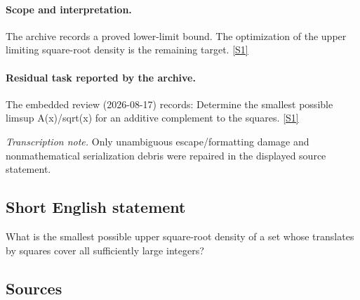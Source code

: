 \documentclass[11pt,a4paper]{article}
\newcommand{\sref}[2]{\hyperlink{source:#1:#2}{[S#2]}}
\begin{document}
\paragraph{Scope and interpretation.}

The archive records a proved lower-limit bound. The optimization of the upper limiting square-root density is the remaining target. \sref{1893}{1}

\paragraph{Residual task reported by the archive.}

The embedded review (2026-08-17) records: Determine the smallest possible limsup A(x)/sqrt(x) for an additive complement to the squares. \sref{1893}{1}

{\small\emph{Transcription note.} Only unambiguous escape/formatting damage and nonmathematical serialization debris were repaired in the displayed source statement.}

\subsection{Short English statement}

What is the smallest possible upper square-root density of a set whose translates by squares cover all sufficiently large integers?

\subsection{Sources}
\end{document}
